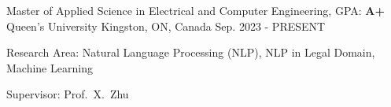 

\begin{cventries}

  \cventry
    {Master of Applied Science in Electrical and Computer Engineering, GPA: \textbf{A+}} %
    {Queen's University} %
    {Kingston, ON, Canada} %
    {Sep. 2023 - PRESENT} %
    {
      \begin{cvitems}
		\item{
          Research Area: Natural Language Processing (NLP), NLP in Legal Domain, Machine Learning
        }
        \item{
          Supervisor: Prof.~X.~Zhu
        }
      \end{cvitems}
    }



\end{cventries}
